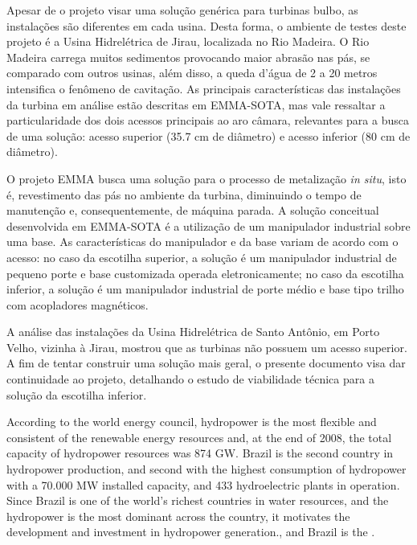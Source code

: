 Apesar de o projeto visar uma solução genérica para turbinas bulbo, as
instalações são diferentes em cada usina. Desta forma, o ambiente de testes
deste projeto é a Usina Hidrelétrica de Jirau, localizada no Rio Madeira. O Rio
Madeira carrega muitos sedimentos provocando maior abrasão nas pás, se comparado
com outros usinas, além disso, a queda d'água de 2 a 20 metros intensifica o
fenômeno de cavitação. As principais características das instalações da turbina
em análise estão descritas em EMMA-SOTA, mas vale ressaltar a particularidade
dos dois acessos principais ao aro câmara, relevantes para a busca de uma
solução: acesso superior (35.7 cm de diâmetro) e acesso inferior (80 cm de
diâmetro).

O projeto EMMA busca uma solução para o processo de metalização \textit{in
situ}, isto é, revestimento das pás no ambiente da turbina, diminuindo o tempo
de manutenção e, consequentemente, de máquina parada.  A solução conceitual
desenvolvida em EMMA-SOTA é a utilização de um manipulador industrial sobre uma
base. As características do manipulador e da base variam de acordo com o
acesso: no caso da escotilha superior, a solução é um manipulador industrial de
pequeno porte e base customizada operada eletronicamente; no caso da escotilha
inferior, a solução é um manipulador industrial de porte médio e base tipo
trilho com acopladores magnéticos.

A análise das instalações da Usina Hidrelétrica de Santo Antônio, em Porto
Velho, vizinha à Jirau, mostrou que as turbinas não possuem um acesso superior.
A fim de tentar construir uma solução mais geral, o presente documento visa dar
continuidade ao projeto, detalhando o estudo de viabilidade técnica para a
solução da escotilha inferior.

According to the world energy council, hydropower is the most flexible and
consistent of the renewable energy resources and, at the end of 2008, the total
capacity of hydropower resources was 874 GW. Brazil is the second
country in hydropower production, and second with the highest
consumption of hydropower with a 70.000 MW installed capacity, and 433
hydroelectric plants in operation. Since Brazil is one of the world's richest
countries in water resources, and the hydropower is the most dominant across
the country, it motivates the development and investment in hydropower
generation., and Brazil is the .


